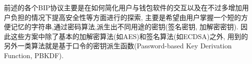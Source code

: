 \documentclass{article}
\begin{document}
前述的各个BIP协议主要是在如何简化用户与钱包软件的交互以及在不过多增加用户负担的情况下提高安全性等方面进行的探索,
主要是希望由用户掌握一个短的方便记忆的字符串,通过密码算法,派生出不同用途的密钥(签名密钥, 加解密密钥).
因此这些方案中除了基本的加解密算法(如AES)和签名算法(如ECDSA)之外,
用到的另外一类算法就是基于口令的密钥派生函数(Password-based Key Derivation Function, PBKDF).








\end{document}
